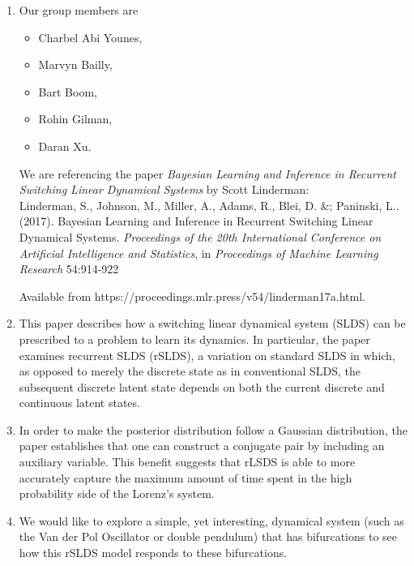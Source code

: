\documentclass[12pt]{report}
\begin{document}
\begin{solution}

    \noindent
    \begin{enumerate}
        \item Our group members are 
        \begin{itemize}
            \item Charbel Abi Younes,

            \item Marvyn Bailly,

            \item Bart Boom,

            \item Rohin Gilman,

            \item Daran Xu.
        \end{itemize}
        We are referencing the paper \emph{Bayesian Learning and Inference in
        Recurrent Switching Linear Dynamical Systems} by Scott Linderman: \\

        
        Linderman, S., Johnson, M., Miller, A., Adams, R., Blei, D. \&; Paninski, L.. (2017). Bayesian Learning and Inference in Recurrent Switching Linear Dynamical Systems. \emph{Proceedings of the 20th International Conference on Artificial Intelligence and Statistics}, in \emph{Proceedings of Machine Learning Research} 54:914-922 
        
        Available from https://proceedings.mlr.press/v54/linderman17a.html. \\
        

        \item This paper describes how a switching linear dynamical system (SLDS) can be prescribed to a problem to learn its dynamics. In particular, the paper examines recurrent SLDS (rSLDS), a variation on standard SLDS in which, as opposed to merely the discrete state as in conventional SLDS, the subsequent discrete latent state depends on both the current discrete and continuous latent states.

        \item In order to make the posterior distribution follow a Gaussian distribution, the paper establishes that one can construct a conjugate pair by including an auxiliary variable. This benefit suggests that rLSDS is able to more accurately capture the maximum amount of time spent in the high probability side of the Lorenz's system. 

        \item We would like to explore a simple, yet interesting, dynamical system (such as the Van der Pol Oscillator or double pendulum) that has bifurcations to see how this rSLDS model responds to these bifurcations.

    \end{enumerate}



\end{solution}
\end{document}
